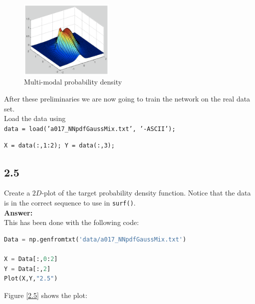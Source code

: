 \documentclass[a4paper]{article}
\begin{document}
\begin{figure}[H]
\center
\includegraphics[width=0.4\textwidth]{Images/multi-modal.png}
\caption{Multi-modal probability density}
\label{Fig:multi-modal}
\end{figure}



After these preliminaries we are now going to train the network on the real data set.\\
Load the data using\\


\hspace{1cm} \texttt{data = load('a017\_NNpdfGaussMix.txt', '-ASCII');}

\hspace{1cm} \texttt{X = data(:,1:2); Y = data(:,3);}\\







\subsection*{2.5}

Create a $2D$-plot of the target probability density function. Notice that the data is in the correct sequence to use in \texttt{surf()}.\\

\textbf{Answer:}\\

This has been done with the following code:

\begin{lstlisting}[language=Python]
Data = np.genfromtxt('data/a017_NNpdfGaussMix.txt')

X = Data[:,0:2]
Y = Data[:,2]
Plot(X,Y,"2.5")
\end{lstlisting}


Figure \ref{2.5} shows the plot:
\end{document}
